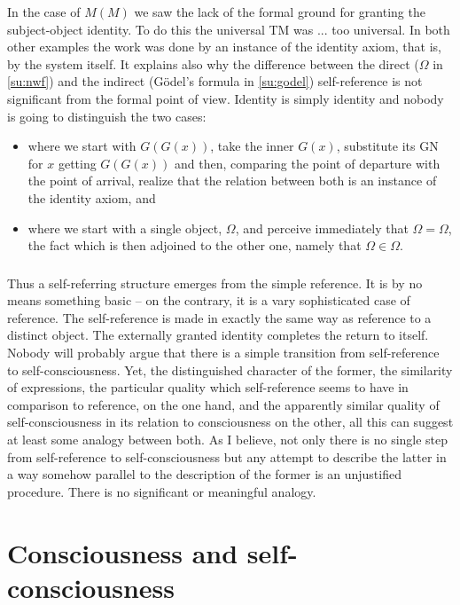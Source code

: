 In the case of $M(M)$ we saw the lack of the formal ground for granting the subject-object identity. To do this 
the universal TM was ... too universal. In both other examples the work was done by an instance of the identity 
axiom, that is, by the system itself. It explains also why the difference between the 
direct ($\Omega$ in \ref{su:nwf}) and the indirect (G\"{o}del's formula in \ref{su:godel}) 
self-reference is not significant from the formal point of view. Identity is simply identity and nobody is going to 
distinguish the two cases:
\begin{itemize}
\item where we start with $G(G(x))$, take the inner $G(x)$, substitute its GN for $x$ 
getting $G(G(x))$ and then, 
comparing the point of departure with the point of arrival, realize that the relation between both is an 
instance of the identity axiom, and
\item where we start with a single object, $\Omega$, and perceive immediately that 
$\Omega=\Omega$, the fact which is then 
adjoined to the other one, namely that $\Omega\in \Omega.$
\end{itemize}  

\subsubsection{}\label{g:iv}
Thus a self-referring structure emerges from the simple reference. It is by no means something basic -- on the 
contrary, it is a vary sophisticated case of reference. The self-reference is made in exactly the same way as reference 
to a distinct object. The externally granted identity completes the return to itself.
Nobody will probably argue that there is a simple transition from self-reference to self-consciousness. Yet, the 
distinguished character of the former, the similarity of expressions, 
 the particular quality which self-reference seems to have in comparison to reference, on the one hand, and the apparently similar quality of self-consciousness in its relation 
to consciousness on the other, all this can suggest at least some analogy between both. As I believe, not only 
there is no single step from self-reference to self-consciousness but any attempt to describe the latter in a way 
somehow parallel to the description of the former is an unjustified procedure. 
There is no significant or meaningful analogy. 

\section{Consciousness and self-consciousness}\label{se:cons}

